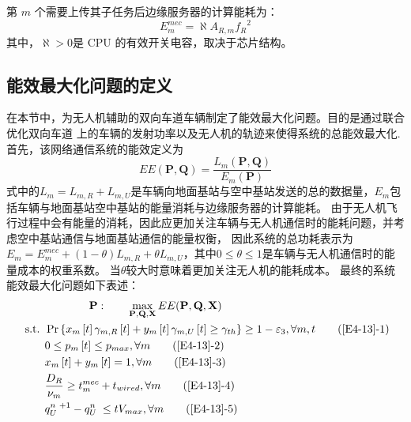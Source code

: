第 $m$ 个需要上传其子任务后边缘服务器的计算能耗为：
\begin{equation} \label{E4-55}
E_{m}^{mec}=\aleph A_{R,m}{f_R}^2%
\end{equation}
其中，$\aleph > 0 $是 CPU 的有效开关电容，取决于芯片结构。
\subsection{能效最大化问题的定义}\label{section4-2-3}
在本节中，为无人机辅助的双向车道车辆制定了能效最大化问题。目的是通过联合优化双向车道
上的车辆的发射功率以及无人机的轨迹来使得系统的总能效最大化.
首先，该网络通信系统的能效定义为
\begin{equation} \label{E4-12}
EE(\mathbf{P}, \mathbf{Q})=
{\frac{{{L}_{m}}\left( \mathbf{P}, \mathbf{Q} \right)}
{{{E}_{m}}\left( \mathbf{P} \right)}}
\end{equation}
式中的${{L}_{m}={L}_{m,R}+{L}_{m,U}}$是车辆向地面基站与空中基站发送的总的数据量，${E}_{m}$包括车辆与地面基站空中基站的能量消耗与边缘服务器的计算能耗。
由于无人机飞行过程中会有能量的消耗，因此应更加关注车辆与无人机通信时的能耗问题，并考虑空中基站通信与地面基站通信的能量权衡，
因此系统的总功耗表示为${{E}_{m}=E_{m}^{mec}+(1-\theta){L}_{m,R}+\theta{L}_{m,U}}$，其中$0\le \theta \le 1$是车辆与无人机通信时的能量成本的权重系数。
当$\theta$较大时意味着更加关注无人机的能耗成本。
最终的系统能效最大化问题如下表述：
\begin{align}
& \qquad\qquad\textbf{P}:\qquad \max_{ \mathbf{P}, \mathbf{Q}, \mathbf{X} }  EE(\mathbf{P}, \mathbf{Q}, \mathbf{X})                \label{E4-13}\\
\text { s.t. }
& \Pr\left\{x_m\left[t\right]\gamma_{m,R}\left[t\right]+y_m\left[t\right]\gamma_{m,U}\left[t\right]\geq \gamma_{th}\right\}\geq1-\varepsilon_3, \forall m,t   \tag{\ref{E4-13}{-1}}      \label{E4-13-1}\\  %
& 0\le p_m\left[t\right]\le p_{max}, \forall m                           \tag{\ref{E4-13}{-2}}      \label{E4-13-2}\\  %
& x_m\left[t\right] + y_m\left[t\right]=1, \forall m                     \tag{\ref{E4-13}{-3}}      \label{E4-13-3}\\  %
& \frac{D_R}{\nu_m} \geq t_{m}^{mec}+t_{wired} , \forall m                           \tag{\ref{E4-13}{-4}}      \label{E4-13-4}\\  %
& q_U^{n\mathrm{\ }+1}-q_U^{n\mathrm{\ }}\le tV_{max}, \forall m         \tag{\ref{E4-13}{-5}}      \label{E4-13-5}    %
\end{align}

